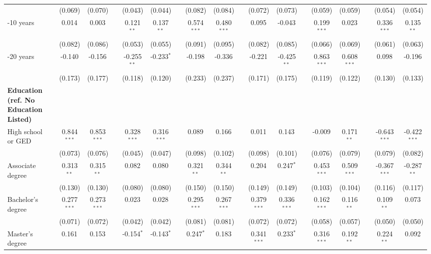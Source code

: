 \begin{table}[!htbp]
{\begin{tabular}{@{\extracolsep{5pt}}l*{18}{c}}
 & & (0.069) & (0.070) & & (0.043) & (0.044) & & (0.082) & (0.084) & & (0.072) & (0.073) & & (0.059) & (0.059) & & (0.054) & (0.054) \\
\quad 6-10 years & & 0.014$^{}$ & 0.003$^{}$ & & 0.121$^{**}$ & 0.137$^{**}$ & & 0.574$^{***}$ & 0.480$^{***}$ & & 0.095$^{}$ & -0.043$^{}$ & & 0.199$^{***}$ & 0.023$^{}$ & & 0.336$^{***}$ & 0.135$^{**}$ \\
 & & (0.082) & (0.086) & & (0.053) & (0.055) & & (0.091) & (0.095) & & (0.082) & (0.085) & & (0.066) & (0.069) & & (0.061) & (0.063) \\
\quad 11-20 years & & -0.140$^{}$ & -0.156$^{}$ & & -0.255$^{**}$ & -0.233$^{*}$ & & -0.198$^{}$ & -0.336$^{}$ & & -0.221$^{}$ & -0.425$^{**}$ & & 0.863$^{***}$ & 0.608$^{***}$ & & 0.098$^{}$ & -0.196$^{}$ \\
 & & (0.173) & (0.177) & & (0.118) & (0.120) & & (0.233) & (0.237) & & (0.171) & (0.175) & & (0.119) & (0.122) & & (0.130) & (0.133) \\
\textbf{Education (ref. No Education Listed)} & & & & & & & & & & & & & & & & & & \\
\quad High school or GED & & 0.844$^{***}$ & 0.853$^{***}$ & & 0.328$^{***}$ & 0.316$^{***}$ & & 0.089$^{}$ & 0.166$^{}$ & & 0.011$^{}$ & 0.143$^{}$ & & -0.009$^{}$ & 0.171$^{**}$ & & -0.643$^{***}$ & -0.422$^{***}$ \\
 & & (0.073) & (0.076) & & (0.045) & (0.047) & & (0.098) & (0.102) & & (0.098) & (0.101) & & (0.076) & (0.079) & & (0.079) & (0.082) \\
\quad Associate degree & & 0.313$^{**}$ & 0.315$^{**}$ & & 0.082$^{}$ & 0.080$^{}$ & & 0.321$^{**}$ & 0.344$^{**}$ & & 0.204$^{}$ & 0.247$^{*}$ & & 0.453$^{***}$ & 0.509$^{***}$ & & -0.367$^{***}$ & -0.287$^{**}$ \\
 & & (0.130) & (0.130) & & (0.080) & (0.080) & & (0.150) & (0.150) & & (0.149) & (0.149) & & (0.103) & (0.104) & & (0.116) & (0.117) \\
\quad Bachelor's degree & & 0.277$^{***}$ & 0.273$^{***}$ & & 0.023$^{}$ & 0.028$^{}$ & & 0.295$^{***}$ & 0.267$^{***}$ & & 0.379$^{***}$ & 0.336$^{***}$ & & 0.162$^{***}$ & 0.116$^{**}$ & & 0.109$^{**}$ & 0.073$^{}$ \\
 & & (0.071) & (0.072) & & (0.042) & (0.042) & & (0.081) & (0.081) & & (0.072) & (0.072) & & (0.058) & (0.057) & & (0.050) & (0.050) \\
\quad Master's degree & & 0.161$^{}$ & 0.153$^{}$ & & -0.154$^{*}$ & -0.143$^{*}$ & & 0.247$^{*}$ & 0.183$^{}$ & & 0.341$^{***}$ & 0.233$^{*}$ & & 0.316$^{***}$ & 0.192$^{**}$ & & 0.224$^{**}$ & 0.092$^{}$ \\

\end{tabular}}
\end{table}
